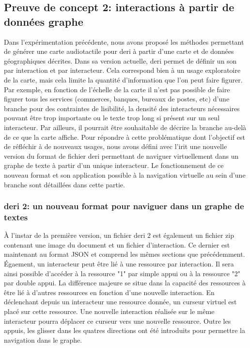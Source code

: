 \subsection{Preuve de concept 2: interactions à partir de données graphe}


Dans l'expérimentation précédente, nous avons proposé les méthodes permettant de générer une carte audiotactile pour \gls{deri} à partir d'une carte et de données géographiques décrites. Dans sa version actuelle, \gls{deri} permet de définir un son par interaction et par interacteur. Cela correspond bien à un usage exploratoire de la carte, mais cela limite la quantité d'information que l'on peut faire figurer. Par exemple, en fonction de l'échelle de la carte il n'est pas possible de faire figurer tous les services (commerces, banques, bureaux de postes, etc) d'une branche pour des contraintes de lisibilité, la densité des interacteurs nécessaires pouvant être trop importante ou le texte trop long si présent sur un seul interacteur. Par ailleurs, il pourrait être souhaitable de décrire la branche au-delà de ce que la carte affiche. Pour répondre à cette problématique dont l'objectif est de réfléchir à de nouveaux usages, nous avons défini avec l'\gls{irit} une nouvelle version du format de fichier \gls{deri} permettant de naviguer virtuellement dans un graphe de texte à partir d'un unique interacteur. Le fonctionnement de ce nouveau format et son application possible à la navigation virtuelle au sein d'une branche sont détaillées dans cette partie.

\subsubsection{\gls{deri} 2: un nouveau format pour naviguer dans un graphe de textes}

À l'instar de la première version, un fichier \gls{deri} 2 est également un fichier zip contenant une image du document et un fichier d'interaction. Ce dernier est maintenant au format JSON et comprend les mêmes sections que précédemment. Égaement, un interacteur peut être lié à une ressource par interaction. Il sera ainsi possible d'accéder à la ressource "1" par simple appui ou à la ressource "2" par double appui. La différence majeure se situe dans la capacité des ressources à être lié à d'autres ressources en fonction d'une nouvelle interaction. En déclenchant depuis un interacteur une ressource donnée, un curseur virtuel est placé sur cette ressource. Une nouvelle interaction réalisée sur le même interacteur pourra déplacer ce curseur vers une nouvelle ressource. Outre les appuis, les glisser dans les quatres directions ont été introduits pour permettre la navigation dans le graphe. 

